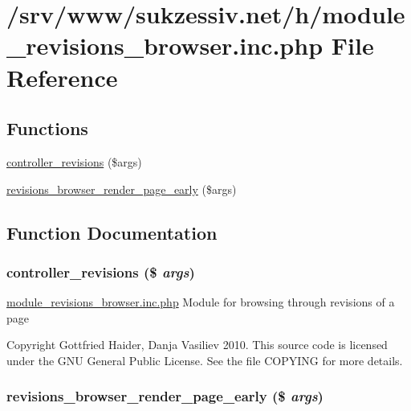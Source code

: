 \hypertarget{module__revisions__browser_8inc_8php}{
\section{/srv/www/sukzessiv.net/h/module\_\-revisions\_\-browser.inc.php File Reference}
\label{module__revisions__browser_8inc_8php}
}
\subsection*{Functions}
\begin{CompactItemize}
\item 
\hyperlink{module__revisions__browser_8inc_8php_9eda010871ad706aca87cfd7b9dd0f7d}{controller\_\-revisions} (\$args)
\item 
\hyperlink{module__revisions__browser_8inc_8php_eb482f35141c71dd933daeec9e9ce599}{revisions\_\-browser\_\-render\_\-page\_\-early} (\$args)
\end{CompactItemize}


\subsection{Function Documentation}
\hypertarget{module__revisions__browser_8inc_8php_9eda010871ad706aca87cfd7b9dd0f7d}{
\subsubsection[{controller\_\-revisions}]{\setlength{\rightskip}{0pt plus 5cm}controller\_\-revisions (\$ {\em args})}}
\label{module__revisions__browser_8inc_8php_9eda010871ad706aca87cfd7b9dd0f7d}


\hyperlink{module__revisions__browser_8inc_8php}{module\_\-revisions\_\-browser.inc.php} Module for browsing through revisions of a page

Copyright Gottfried Haider, Danja Vasiliev 2010. This source code is licensed under the GNU General Public License. See the file COPYING for more details. \hypertarget{module__revisions__browser_8inc_8php_eb482f35141c71dd933daeec9e9ce599}{
\subsubsection[{revisions\_\-browser\_\-render\_\-page\_\-early}]{\setlength{\rightskip}{0pt plus 5cm}revisions\_\-browser\_\-render\_\-page\_\-early (\$ {\em args})}}
\label{module__revisions__browser_8inc_8php_eb482f35141c71dd933daeec9e9ce599}


